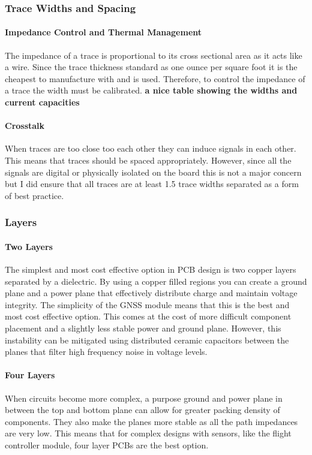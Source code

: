 \subsubsection{Trace Widths and Spacing}
\paragraph{Impedance Control and Thermal Management}
The impedance of a trace is proportional to its cross sectional area as it acts like a wire. Since the trace thickness standard as one ounce per square foot it is the cheapest to manufacture with and is used. Therefore, to control the impedance of a trace the width must be calibrated. \textbf{a nice table showing the widths and current capacities}
\paragraph{Crosstalk}
When traces are too close too each other they can induce signals in each other. This means that traces should be spaced appropriately. However, since all the signals are digital or physically isolated on the board this is not a major concern but I did ensure that all traces are at least 1.5 trace widths separated as a form of best practice. 

\subsubsection{Layers}
\paragraph{Two Layers}
The simplest and most cost effective option in \gls{PCB} design is two copper layers separated by a dielectric. By using a copper filled regions you can create a ground plane and a power plane that effectively distribute charge and maintain voltage integrity. The simplicity of the \gls{GNSS} module means that this is the best and most cost effective option. This comes at the cost of more difficult component placement and a slightly less stable power and ground plane. However, this instability can be mitigated using distributed ceramic capacitors between the planes that filter high frequency noise in voltage levels.
\paragraph{Four Layers}
When circuits become more complex, a purpose ground and power plane in between the top and bottom plane can allow for greater packing density of components. They also make the planes more stable as all the path impedances are very low. This means that for complex designs with sensors, like the flight controller module, four layer \gls{PCB}s are the best option.
